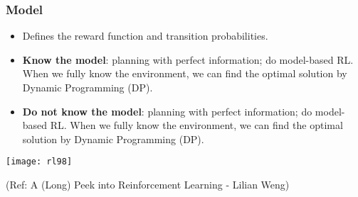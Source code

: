 
















\begin{frame}[fragile]\frametitle{Model}


\begin{itemize}
\item Defines the reward function and transition probabilities.
\item {\bf Know the model}: planning with perfect information; do model-based RL. When we fully know the
environment, we can find the optimal solution by Dynamic Programming (DP).
\item {\bf Do not know the model}: planning with perfect information; do model-based RL. When we fully know the
environment, we can find the optimal solution by Dynamic Programming (DP).
\end{itemize}


\begin{center}
\texttt{[image: rl98]}
\end{center}


{\tiny (Ref: A (Long) Peek into Reinforcement Learning - Lilian Weng)}


\end{frame}


